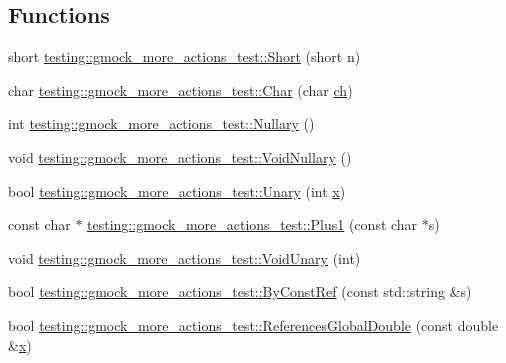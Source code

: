 \subsection*{Functions}
\begin{DoxyCompactItemize}
\item 
short \mbox{\hyperlink{namespacetesting_1_1gmock__more__actions__test_a00503d3168f1123e314c0d42b7e10b88}{testing\+::gmock\+\_\+more\+\_\+actions\+\_\+test\+::\+Short}} (short n)
\item 
char \mbox{\hyperlink{namespacetesting_1_1gmock__more__actions__test_af69e6906d734a99d60480e4291891d66}{testing\+::gmock\+\_\+more\+\_\+actions\+\_\+test\+::\+Char}} (char \mbox{\hyperlink{_obj__test_2lib_2googletest-master_2googlemock_2test_2gmock-matchers__test_8cc_af53f92900705f7de3c139a05b2f9ef16}{ch}})
\item 
int \mbox{\hyperlink{namespacetesting_1_1gmock__more__actions__test_acdd2dd80f777fdb770b513b63064ac19}{testing\+::gmock\+\_\+more\+\_\+actions\+\_\+test\+::\+Nullary}} ()
\item 
void \mbox{\hyperlink{namespacetesting_1_1gmock__more__actions__test_a061f6d66383a4e793b4d4ca93bd8ca2f}{testing\+::gmock\+\_\+more\+\_\+actions\+\_\+test\+::\+Void\+Nullary}} ()
\item 
bool \mbox{\hyperlink{namespacetesting_1_1gmock__more__actions__test_aad456ea2ee1b0cb2741b676a34f540a3}{testing\+::gmock\+\_\+more\+\_\+actions\+\_\+test\+::\+Unary}} (int \mbox{\hyperlink{_obj__test_2lib_2googletest-master_2googlemock_2test_2gmock-matchers__test_8cc_a6150e0515f7202e2fb518f7206ed97dc}{x}})
\item 
const char $\ast$ \mbox{\hyperlink{namespacetesting_1_1gmock__more__actions__test_a7ffa7fd75ffadf90e8ec8867e5cb53cf}{testing\+::gmock\+\_\+more\+\_\+actions\+\_\+test\+::\+Plus1}} (const char $\ast$s)
\item 
void \mbox{\hyperlink{namespacetesting_1_1gmock__more__actions__test_a163632ef644604032f00334fce36de1a}{testing\+::gmock\+\_\+more\+\_\+actions\+\_\+test\+::\+Void\+Unary}} (int)
\item 
bool \mbox{\hyperlink{namespacetesting_1_1gmock__more__actions__test_a38903b39cda75bfa5c932f4abec7a0ca}{testing\+::gmock\+\_\+more\+\_\+actions\+\_\+test\+::\+By\+Const\+Ref}} (const std\+::string \&s)
\item 
bool \mbox{\hyperlink{namespacetesting_1_1gmock__more__actions__test_ae2d3dddc96f5657127593f129cd3fc51}{testing\+::gmock\+\_\+more\+\_\+actions\+\_\+test\+::\+References\+Global\+Double}} (const double \&\mbox{\hyperlink{_obj__test_2lib_2googletest-master_2googlemock_2test_2gmock-matchers__test_8cc_a6150e0515f7202e2fb518f7206ed97dc}{x}})

\end{DoxyCompactItemize}

